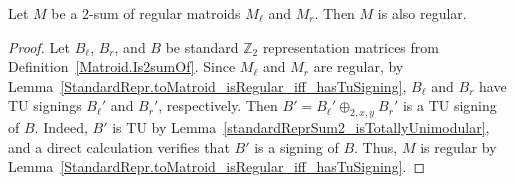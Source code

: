 \begin{theorem}
    \label{Matroid.Is2sumOf.isRegular}
    \leanok
    Let $M$ be a $2$-sum of regular matroids $M_{\ell}$ and $M_{r}$. Then $M$ is also regular.
\end{theorem}

\begin{proof}
    \leanok
    Let $B_{\ell}$, $B_{r}$, and $B$ be standard $\mathbb{Z}_{2}$ representation matrices from Definition~\ref{Matroid.Is2sumOf}. Since $M_{\ell}$ and $M_{r}$ are regular, by Lemma~\ref{StandardRepr.toMatroid_isRegular_iff_hasTuSigning}, $B_{\ell}$ and $B_{r}$ have TU signings $B_{\ell}'$ and $B_{r}'$, respectively. Then $B' = B_{\ell}' \oplus_{2, x, y} B_{r}'$ is a TU signing of $B$. Indeed, $B'$ is TU by Lemma~\ref{standardReprSum2_isTotallyUnimodular}, and a direct calculation verifies that $B'$ is a signing of $B$. Thus, $M$ is regular by Lemma~\ref{StandardRepr.toMatroid_isRegular_iff_hasTuSigning}.
\end{proof}

